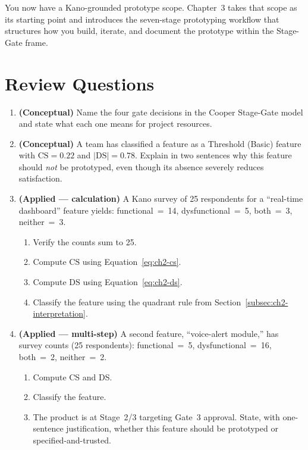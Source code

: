 You now have a Kano-grounded prototype scope.
Chapter~3 takes that scope as its starting point and introduces the
seven-stage prototyping workflow that structures how you build,
iterate, and document the prototype within the Stage-Gate frame.

\section*{Review Questions}

\begin{enumerate}

  \item \textbf{(Conceptual)} Name the four gate decisions in the Cooper Stage-Gate
  model and state what each one means for project resources.

  \item \textbf{(Conceptual)} A team has classified a feature as a Threshold (Basic)
  feature with $\mathrm{CS} = 0.22$ and $|\mathrm{DS}| = 0.78$.
  Explain in two sentences why this feature should \emph{not} be prototyped, even
  though its absence severely reduces satisfaction.

  \item \textbf{(Applied --- calculation)} A Kano survey of 25 respondents for a
  ``real-time dashboard'' feature yields: functional~=~14, dysfunctional~=~5,
  both~=~3, neither~=~3.
  \begin{enumerate}
    \item Verify the counts sum to 25.
    \item Compute $\mathrm{CS}$ using Equation~\ref{eq:ch2-cs}.
    \item Compute $\mathrm{DS}$ using Equation~\ref{eq:ch2-ds}.
    \item Classify the feature using the quadrant rule from
          Section~\ref{subsec:ch2-interpretation}.
  \end{enumerate}

  \item \textbf{(Applied --- multi-step)} A second feature, ``voice-alert module,''
  has survey counts (25 respondents): functional~=~5, dysfunctional~=~16,
  both~=~2, neither~=~2.
  \begin{enumerate}
    \item Compute CS and DS.
    \item Classify the feature.
    \item The product is at Stage~2/3 targeting Gate~3 approval.
          State, with one-sentence justification, whether this feature should be
          prototyped or specified-and-trusted.
  \end{enumerate}

\end{enumerate}
